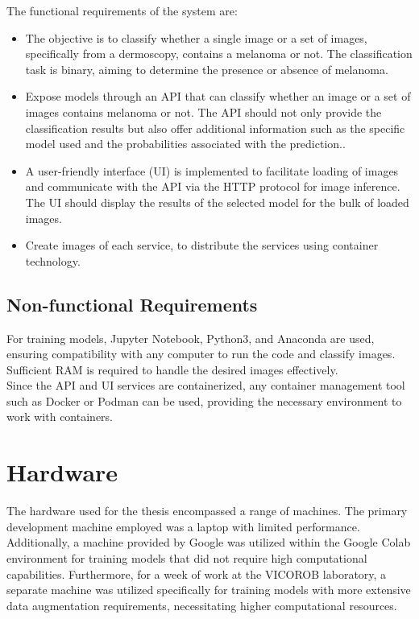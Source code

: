 The functional requirements of the system are:

\begin{itemize} \item The objective is to classify whether a single image or a
      set of images, specifically from a dermoscopy, contains a melanoma or
      not. The classification task is binary, aiming to determine the presence
      or absence of melanoma.

    \item Expose models through an API that can classify whether an image or a
      set of images contains melanoma or not. The API should not only provide
      the classification results but also offer additional information such as
      the specific model used and the probabilities associated with the
      prediction..

    \item A user-friendly interface (UI) is implemented to facilitate loading
      of images and communicate with the API via the HTTP protocol for image
      inference. The UI should display the results of the selected model for
      the bulk of loaded images.

    \item Create images of each service, to distribute the services using container
      technology.
\end{itemize}

\subsection{Non-functional Requirements}

For training models, Jupyter Notebook, Python3, and Anaconda are used, ensuring
compatibility with any computer to run the code and classify images. Sufficient
RAM is required to handle the desired images effectively. \\

Since the API and UI services are containerized, any container management tool
such as Docker or Podman can be used, providing the necessary environment to
work with containers.

\newpage

\section{Hardware}

The hardware used for the thesis encompassed a range of machines. The primary
development machine employed was a laptop with limited performance.
Additionally, a machine provided by Google was utilized within the Google Colab
environment for training models that did not require high computational
capabilities. Furthermore, for a week of work at the VICOROB laboratory, a
separate machine was utilized specifically for training models with more
extensive data augmentation requirements, necessitating higher computational
resources. \\

